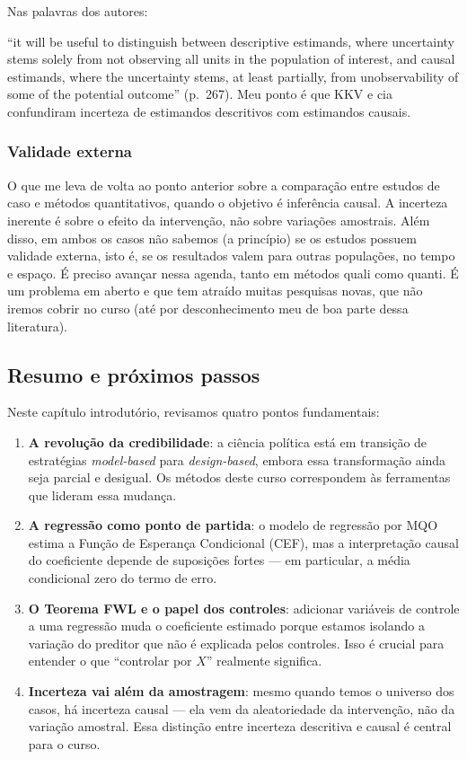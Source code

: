 \documentclass[
]{article}
\begin{document}
Nas palavras dos autores:

``it will be useful to distinguish between descriptive estimands, where uncertainty stems solely from not observing all units in the population of interest, and causal estimands, where the uncertainty stems, at least partially, from unobservability of some of the potential outcome'' (p.~267). Meu ponto é que KKV e cia confundiram incerteza de estimandos descritivos com estimandos causais.

\subsubsection{Validade externa}\label{validade-externa}

O que me leva de volta ao ponto anterior sobre a comparação entre estudos de caso e métodos quantitativos, quando o objetivo é inferência causal. A incerteza inerente é sobre o efeito da intervenção, não sobre variações amostrais. Além disso, em ambos os casos não sabemos (a princípio) se os estudos possuem validade externa, isto é, se os resultados valem para outras populações, no tempo e espaço. É preciso avançar nessa agenda, tanto em métodos quali como quanti. É um problema em aberto e que tem atraído muitas pesquisas novas, que não iremos cobrir no curso (até por desconhecimento meu de boa parte dessa literatura).

\subsection{Resumo e próximos passos}\label{resumo-e-pruxf3ximos-passos}

Neste capítulo introdutório, revisamos quatro pontos fundamentais:

\begin{enumerate}
\def\labelenumi{\arabic{enumi}.}
\item
  \textbf{A revolução da credibilidade}: a ciência política está em transição de estratégias \emph{model-based} para \emph{design-based}, embora essa transformação ainda seja parcial e desigual. Os métodos deste curso correspondem às ferramentas que lideram essa mudança.
\item
  \textbf{A regressão como ponto de partida}: o modelo de regressão por MQO estima a Função de Esperança Condicional (CEF), mas a interpretação causal do coeficiente depende de suposições fortes --- em particular, a média condicional zero do termo de erro.
\item
  \textbf{O Teorema FWL e o papel dos controles}: adicionar variáveis de controle a uma regressão muda o coeficiente estimado porque estamos isolando a variação do preditor que não é explicada pelos controles. Isso é crucial para entender o que ``controlar por \(X\)'' realmente significa.
\item
  \textbf{Incerteza vai além da amostragem}: mesmo quando temos o universo dos casos, há incerteza causal --- ela vem da aleatoriedade da intervenção, não da variação amostral. Essa distinção entre incerteza descritiva e causal é central para o curso.
\end{enumerate}
\end{document}
